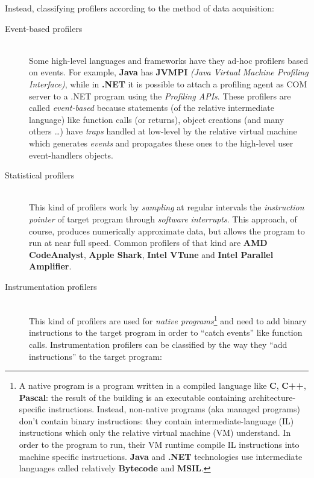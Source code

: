 \documentclass[a4paper,11pt]{report}
\begin{document}
\begin{flushleft}
Instead, classifying profilers according to the method of data acquisition:
\end{flushleft}


\begin{description}
\item[Event-based profilers] \hfill \\
Some high-level languages and frameworks have they ad-hoc profilers based on
events. For example, \textbf{Java} has \textbf{JVMPI} \textit{(Java Virtual
Machine Profiling Interface)}, while in \textbf{.NET} it is possible to attach a
profiling agent as COM server to a .NET program using the \emph{Profiling APIs}.
These profilers are called \emph{event-based} because statements (of the
relative intermediate language) like function calls (or returns), object
creations (and many others \ldots) have \emph{traps} handled at low-level by the
relative virtual machine which generates \emph{events} and propagates these ones
to the high-level user event-handlers objects.

\item[Statistical profilers] \hfill \\
This kind of profilers work by \emph{sampling} at regular intervals the
\emph{instruction pointer} of target program through \emph{software interrupts}.
This approach, of course, produces numerically approximate data, but allows the
program to run at near full speed. Common profilers of that kind are \textbf{AMD
CodeAnalyst}, \textbf{Apple Shark}, \textbf{Intel VTune} and \textbf{Intel
Parallel Amplifier}.

\item[Instrumentation profilers] \hfill \\
This kind of profilers are used for \emph{native programs}\footnote{A native
program is a program written in a compiled language like \textbf{C},
\textbf{C++}, \textbf{Pascal}: the result of the building is an executable
containing architecture-specific instructions. Instead, non-native programs (aka
managed programs) don't contain binary instructions: they contain
intermediate-language (IL) instructions which only the relative virtual machine
(VM) understand. In order to the program to run, their VM runtime compile IL
instructions into machine specific instructions. \textbf{Java} and \textbf{.NET}
technologies use intermediate languages called relatively \textbf{Bytecode} and
\textbf{MSIL}.} and need to add binary instructions to the target program in
order to ``catch events'' like function calls. Instrumentation profilers can be
classified by the way they ``add instructions'' to the target program:


\end{description}
\end{document}
